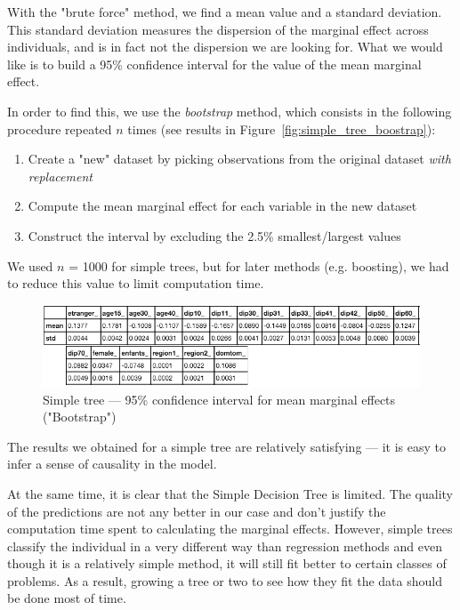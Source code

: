 With the "brute force" method, we find a mean value and a standard deviation. This standard deviation measures the dispersion of the marginal effect across individuals, and is in fact not the dispersion we are looking for. What we would like is to build a 95\% confidence interval for the value of the mean marginal effect.

In order to find this, we use the \textit{bootstrap} method, which consists in the following procedure repeated $n$ times (see results in Figure~\ref{fig:simple_tree_boostrap}):

\begin{enumerate}
    \item Create a "new" dataset by picking observations from the original dataset \textit{with replacement}
    \item Compute the mean marginal effect for each variable in the new dataset
    \item Construct the interval by excluding the 2.5\% smallest/largest values
\end{enumerate}

We used $n$ = 1000 for simple trees, but for later methods (e.g. boosting), we had to reduce this value to limit computation time.

\begin{figure}
    \centering
    \includegraphics[scale=0.35]{img/simple_tree_bootstrap.png}
    \caption{Simple tree --- 95\% confidence interval for mean marginal effects ("Bootstrap")}
    \label{fig:simple_tree_bootstrap}
\end{figure}

The results we obtained for a simple tree are relatively satisfying --- it is easy to infer a sense of causality in the model.

At the same time, it is clear that the Simple Decision Tree is limited. The quality of the predictions are not any better in our case and don't justify the computation time spent to calculating the marginal effects. However, simple trees classify the individual in a very different way than regression methods and even though it is a relatively simple method, it will still fit better to certain classes of problems. As a result, growing a tree or two to see how they fit the data should be done most of time.

